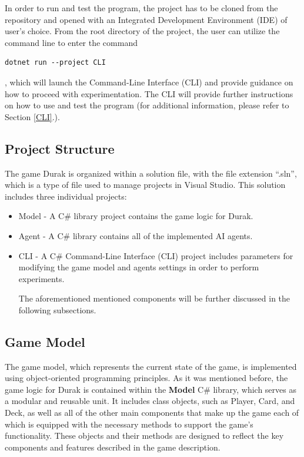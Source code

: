 In order to run and test the program, the project has to be cloned from the repository and opened with an Integrated Development Environment (IDE) of user's choice. From the root directory of the project, the user can utilize the command line to enter the command 
\begin{verbatim}
dotnet run --project CLI
\end{verbatim}
, which will launch the Command-Line Interface (CLI) and provide guidance on how to proceed with experimentation. The CLI will provide further instructions on how to use and test the program (for additional information, please refer to Section \ref{CLI}.).

\subsection{Project Structure}
The game Durak is organized within a solution file, with the file extension ``.sln'', which is a type of file used to manage projects in Visual Studio. This solution includes three individual projects: 

\begin{itemize}

\item Model - A C\# library project contains the game logic for Durak.

\item Agent - A C\# library contains all of the implemented AI agents.

\item CLI - A C\# Command-Line Interface (CLI) project includes parameters for modifying the game model and agents settings in order to perform experiments.

The aforementioned mentioned components will be further discussed in the following subsections.

\end{itemize}

\subsection{Game Model}

The game model, which represents the current state of the game, is implemented using object-oriented programming principles. As it was mentioned before, the game logic for Durak is contained within the \textbf{Model} C\# library, which serves as a modular and reusable unit. It includes class objects, such as Player, Card, and Deck, as well as all of the other main components that make up the game each of which is equipped with the necessary methods to support the game's functionality. These objects and their methods are designed to reflect the key components and features described in the game description.

